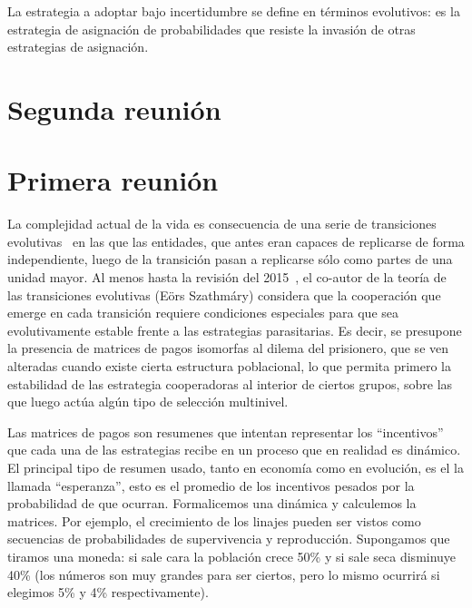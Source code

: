 \documentclass[a4paper,10pt]{article}
\begin{document}
La estrategia a adoptar bajo incertidumbre se define en términos evolutivos: es la estrategia de asignación de probabilidades que resiste la invasión de otras estrategias de asignación.





\section{Segunda reunión}


 


\section{Primera reunión}


La complejidad actual de la vida es consecuencia de una serie de transiciones evolutivas~\cite{maynardSmith1995-majorTransitions} en las que las entidades, que antes eran capaces de replicarse de forma independiente, luego de la transición pasan a replicarse sólo como partes de una unidad mayor.
Al menos hasta la revisión del 2015~\cite{szathmary2015-evolutionaryTransitions}, el co-autor de la teoría de las transiciones evolutivas (Eörs Szathmáry) considera que la cooperación que emerge en cada transición requiere condiciones especiales para que sea evolutivamente estable frente a las estrategias parasitarias.
Es decir, se presupone la presencia de matrices de pagos isomorfas al dilema del prisionero, que se ven alteradas cuando existe cierta estructura poblacional, lo que permita primero la estabilidad de las estrategia cooperadoras al interior de ciertos grupos, sobre las que luego actúa algún tipo de selección multinivel.


Las matrices de pagos son resumenes que intentan representar los ``incentivos'' que cada una de las estrategias recibe en un proceso que en realidad es dinámico.
El principal tipo de resumen usado, tanto en economía como en evolución, es el la llamada ``esperanza'', esto es el promedio de los incentivos pesados por la probabilidad de que ocurran.
Formalicemos una dinámica y calculemos la matrices.
Por ejemplo, el crecimiento de los linajes pueden ser vistos como secuencias de probabilidades de supervivencia y reproducción.
Supongamos que tiramos una moneda: si sale cara la población crece 50\% y si sale seca disminuye 40\% (los números son muy grandes para ser ciertos, pero lo mismo ocurrirá si elegimos 5\% y 4\% respectivamente).
\end{document}
